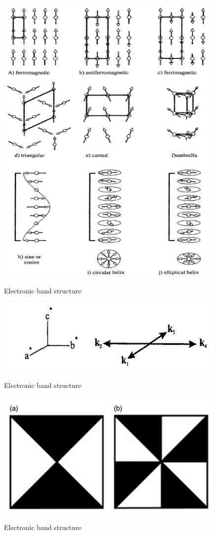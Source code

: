 \documentclass[11pt,edeposit,draftthesis]{uiucthesis2020}
\begin{document}
\begin{mainmatter}
\begin{figure}
\centering\includegraphics[width=\columnwidth]{figures/ch3/mag_structures_single_k.png} \\
\caption{\label{fig:mag_structures_single_k}
Electronic band structure
}
\end{figure}

\begin{figure}
\centering\includegraphics[width=0.7\columnwidth]{figures/ch3/star_of_propagation_vector_k.png} \\
\caption{\label{fig:star}
Electronic band structure
}
\end{figure}

\begin{figure}
\centering\includegraphics[width=0.5\columnwidth]{figures/ch3/symmetry_based_analysis.png} \\
\caption{\label{fig:symmetry_based_analysis}
Electronic band structure
}
\end{figure}


\end{mainmatter}
\end{document}
